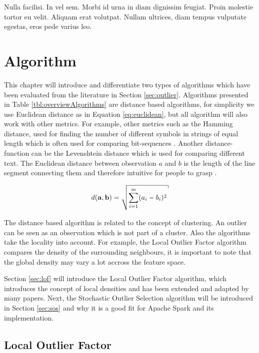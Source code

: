 \begin{savequote}[75mm] 
Nulla facilisi. In vel sem. Morbi id urna in diam dignissim feugiat. Proin molestie tortor eu velit. Aliquam erat volutpat. Nullam ultrices, diam tempus vulputate egestas, eros pede varius leo.
\end{savequote}

\chapter{Algorithm \label{chap:algorithm}}

This chapter will introduce and differentiate two types of algorithms which have been evaluated from the literature in Section \ref{sec:outlier}. Algorithms presented in Table \ref{tbl:overviewAlgorithms} are distance based algorithms, for simplicity we use Euclidean distance as in Equation \ref{eq:euclidean}, but all algorithm will also work with other metrics. For example, other metrics such as the Hamming distance, used for finding the number of different symbols in strings of equal length which is often used for comparing bit-sequences \cite{citeulike:1667687}. Another distance-function can be the Levenshtein distance which is used for comparing different text. The Euclidean distance between observation $a$ and $b$ is the length of the line segment connecting them and therefore intuitive for people to grasp \cite{Deza2009EncyclopediaofDistances}.

\begin{equation}
d({\bf a},{\bf b}) = \sqrt{\sum^{m}_{i=1} (a_{i} - b_{i})^2} \label{eq:euclidean}
\end{equation}

The distance based algorithm is related to the concept of clustering. An outlier can be seen as an observation which is not part of a cluster. Also the algorithms take the locality into account. For example, the Local Outlier Factor algorithm compares the density of the surrounding neighbours, it is important to note that the global density may vary a lot accross the feature space.

Section \ref{sec:lof} will introduce the Local Outlier Factor algorithm, which introduces the concept of local densities and has been extended and adapted by many papers. Next, the Stochastic Outlier Selection algorithm will be introduced in Section \ref{sec:sos} and why it is a good fit for Apache Spark and its implementation.

\section{Local Outlier Factor \label{sec:lof}}

